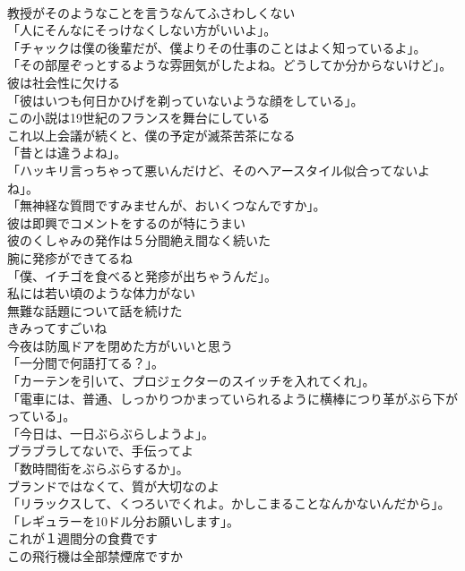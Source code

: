 \documentclass[8pt]{extreport}
\begin{document}
\begin{CJK}{UTF8}{min}
\\	教授がそのようなことを言うなんてふさわしくない	
\\	「人にそんなにそっけなくしない方がいいよ」。	
\\	「チャックは僕の後輩だが、僕よりその仕事のことはよく知っているよ」。	
\\	「その部屋ぞっとするような雰囲気がしたよね。どうしてか分からないけど」。	
\\	彼は社会性に欠ける	
\\	「彼はいつも何日かひげを剃っていないような顔をしている」。	
\\	この小説は19世紀のフランスを舞台にしている	
\\	これ以上会議が続くと、僕の予定が滅茶苦茶になる	
\\	「昔とは違うよね」。	
\\	「ハッキリ言っちゃって悪いんだけど、そのヘアースタイル似合ってないよね」。	
\\	「無神経な質問ですみませんが、おいくつなんですか」。	
\\	彼は即興でコメントをするのが特にうまい	
\\	彼のくしゃみの発作は５分間絶え間なく続いた	
\\	腕に発疹ができてるね	
\\	「僕、イチゴを食べると発疹が出ちゃうんだ」。	
\\	私には若い頃のような体力がない	
\\	無難な話題について話を続けた	
\\	きみってすごいね	
\\	今夜は防風ドアを閉めた方がいいと思う	
\\	「一分間で何語打てる？」。	
\\	「カーテンを引いて、プロジェクターのスイッチを入れてくれ」。	
\\	「電車には、普通、しっかりつかまっていられるように横棒につり革がぶら下がっている」。	
\\	「今日は、一日ぶらぶらしようよ」。	
\\	ブラブラしてないで、手伝ってよ	
\\	「数時間街をぶらぶらするか」。	
\\	ブランドではなくて、質が大切なのよ	
\\	「リラックスして、くつろいでくれよ。かしこまることなんかないんだから」。	
\\	「レギュラーを10ドル分お願いします」。	
\\	これが１週間分の食費です	
\\	この飛行機は全部禁煙席ですか	

\end{CJK}
\end{document}

